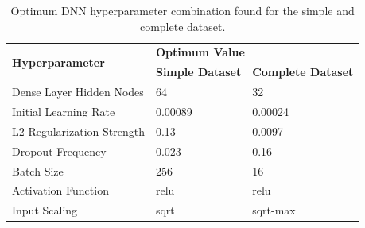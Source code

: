 




\begin{table}[H]
\centering
\caption{Optimum DNN hyperparameter combination found for the simple and complete dataset.}
\label{table:hyperparameter_opt_parameters_DNN}
\begin{tabular}{lll}
\hline
\multirow{2}{*}{\textbf{Hyperparameter}} & \multicolumn{2}{l}{\textbf{Optimum Value}} \\
 & \textbf{Simple Dataset} & \textbf{Complete Dataset} \\ \hline
Dense Layer Hidden Nodes & 64 & 32 \\
Initial Learning Rate & 0.00089 & 0.00024 \\
L2 Regularization Strength & 0.13 & 0.0097 \\
Dropout Frequency & 0.023 & 0.16 \\
Batch Size & 256 & 16 \\
Activation Function & relu & relu \\
Input Scaling & sqrt & sqrt-max \\ \hline
\end{tabular}
\end{table}





